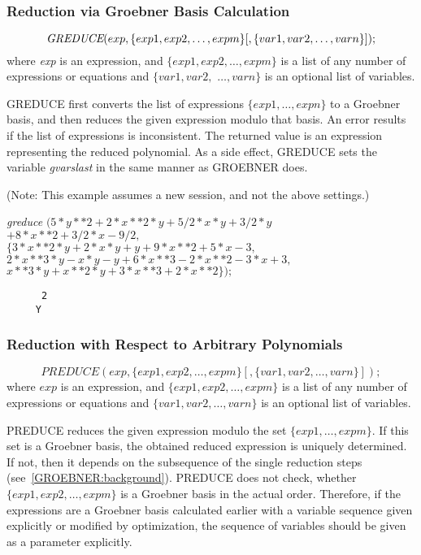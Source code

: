 \subsubsection{Reduction via Groebner Basis Calculation}
\[
\mbox{\it  GREDUCE}(exp, \{exp1, exp2, \ldots , expm\}[,\{var1, var2,
\ldots , varn\}]);
\]
where {\it exp} is an expression, and $\{exp1, exp2,\ldots , expm\}$ is
a list of any number of expressions or equations and $\{var1, var2,$
$\ldots , varn\}$ is an optional list of variables.

GREDUCE first converts the list of expressions $\{exp1, \ldots ,
expn\}$ to a Groeb\-ner basis, and then reduces the given expression
modulo that basis.  An error results if the list of expressions is
inconsistent. The returned value is an expression representing the
reduced polynomial. As a side effect, GREDUCE sets the variable {\it
gvarslast} in the same manner as GROEBNER does.

\example{}

(Note: This example assumes a new session, and not the above
settings.)

{\it greduce} $( 5*y**2 + 2*x**2*y + 5/2*x*y + 3/2*y$\\
\hspace*{+1cm} $ + 8*x**2 + 3/2*x - 9/2, $\\
\hspace*{+1cm} $\{ 3*x**2*y + 2*x*y + y + 9*x**2 + 5*x - 3,$ \\
\hspace*{+1cm} $ 2*x**3*y - x*y - y + 6*x**3 - 2*x**2 - 3*x + 3,$ \\
\hspace*{+1cm} $ x**3*y + x**2*y + 3*x**3 + 2*x**2 \});$
\begin{verbatim}
      2
     Y
\end{verbatim}
\subsubsection{Reduction with Respect to Arbitrary Polynomials}
\[
 PREDUCE(exp, \{exp1, exp2,\ldots , expm\}[,\{var1, var2,\ldots ,
varn\}]);
\]
where $ exp $  is an expression, and $\{exp1, exp2, \ldots ,
expm \}$ is a list of any number of expressions or equations and
$\{var1, var2, \ldots , varn\}$ is an optional list of variables.

PREDUCE reduces the given expression modulo the set $\{exp1,
\ldots , expm\}$. If this set is a Groebner basis, the obtained reduced
expression is uniquely determined. If not, then it depends on the
subsequence of the single reduction steps
(see~\ref{GROEBNER:background}). PREDUCE does not check, whether
$\{exp1, exp2, \ldots , expm\}$ is a Groebner basis in the actual
order. Therefore, if the expressions are a Groebner basis calculated
earlier with a variable sequence given explicitly or modified by
optimization, the sequence of variables should be given as a parameter
explicitly.

